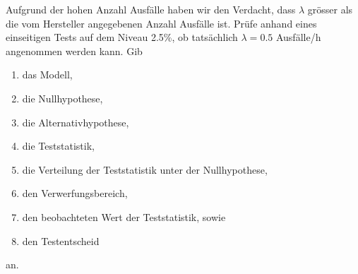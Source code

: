 \documentclass[10pt,a4paper,twocolumn]{article}
\begin{document}
Aufgrund der hohen Anzahl Ausfälle haben wir den Verdacht, dass $\lambda$ grösser als die vom Hersteller angegebenen Anzahl Ausfälle ist. Prüfe anhand eines einseitigen Tests auf dem Niveau 2.5\%, ob tatsächlich $\lambda=0.5$ Ausfälle/h angenommen werden kann. Gib
\begin{enumerate}
\item das Modell,
\item die Nullhypothese,
\item die Alternativhypothese,
\item die Teststatistik,
\item die Verteilung der Teststatistik unter der Nullhypothese,
\item den Verwerfungsbereich,
\item den beobachteten Wert der Teststatistik, sowie
\item den Testentscheid
\end{enumerate}
an.

\vspace{10pt}
\end{document}
